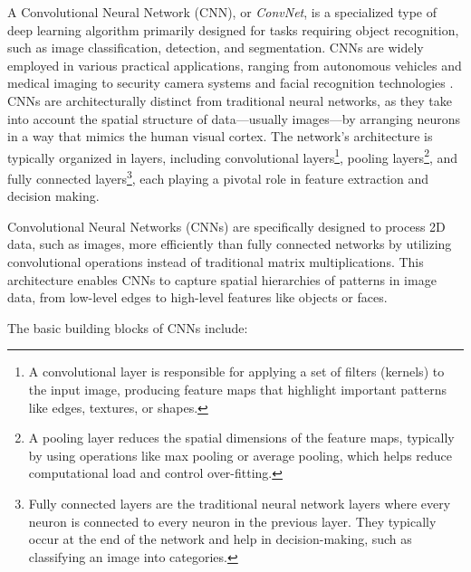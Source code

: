 A Convolutional Neural Network (CNN), or \textit{ConvNet}, is a specialized type of deep learning algorithm primarily designed for tasks requiring object recognition, such as image classification, detection, and segmentation. CNNs are widely employed in various practical applications, ranging from autonomous vehicles and medical imaging to security camera systems and facial recognition technologies \cite{DBLP:journals/corr/OSheaN15}. CNNs are architecturally distinct from traditional neural networks, as they take into account the spatial structure of data—usually images—by arranging neurons in a way that mimics the human visual cortex. The network's architecture is typically organized in layers, including convolutional layers\footnote{A convolutional layer is responsible for applying a set of filters (kernels) to the input image, producing feature maps that highlight important patterns like edges, textures, or shapes.}, pooling layers\footnote{A pooling layer reduces the spatial dimensions of the feature maps, typically by using operations like max pooling or average pooling, which helps reduce computational load and control over-fitting.}, and fully connected layers\footnote{Fully connected layers are the traditional neural network layers where every neuron is connected to every neuron in the previous layer. They typically occur at the end of the network and help in decision-making, such as classifying an image into categories.}, each playing a pivotal role in feature extraction and decision making.

Convolutional Neural Networks (CNNs) are specifically designed to process 2D data, such as images, more efficiently than fully connected networks by utilizing convolutional operations instead of traditional matrix multiplications. This architecture enables CNNs to capture spatial hierarchies of patterns in image data, from low-level edges to high-level features like objects or faces.

The basic building blocks of CNNs include:

